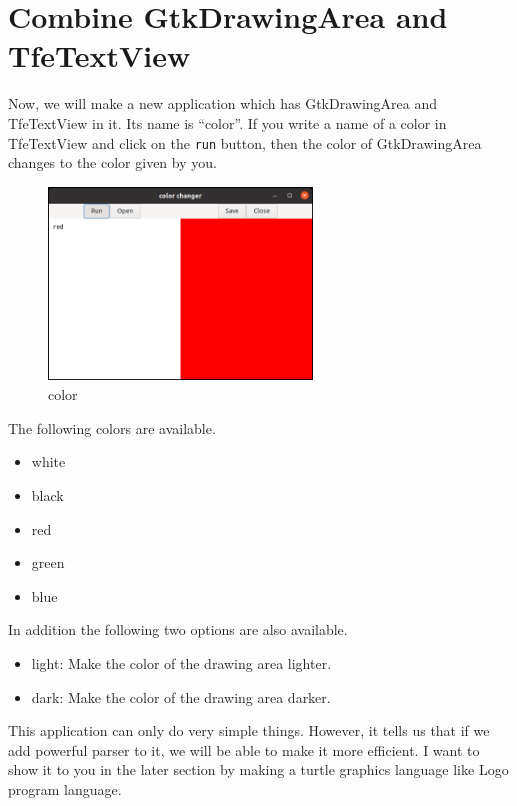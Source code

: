 \hypertarget{combine-gtkdrawingarea-and-tfetextview}{%
\section{Combine GtkDrawingArea and
TfeTextView}\label{combine-gtkdrawingarea-and-tfetextview}}

Now, we will make a new application which has GtkDrawingArea and
TfeTextView in it. Its name is ``color''. If you write a name of a color
in TfeTextView and click on the \passthrough{\lstinline!run!} button,
then the color of GtkDrawingArea changes to the color given by you.

\begin{figure}
\centering
\includegraphics[width=7cm,height=5.13cm]{../image/color.png}
\caption{color}
\end{figure}

The following colors are available.

\begin{itemize}
\tightlist
\item
  white
\item
  black
\item
  red
\item
  green
\item
  blue
\end{itemize}

In addition the following two options are also available.

\begin{itemize}
\tightlist
\item
  light: Make the color of the drawing area lighter.
\item
  dark: Make the color of the drawing area darker.
\end{itemize}

This application can only do very simple things. However, it tells us
that if we add powerful parser to it, we will be able to make it more
efficient. I want to show it to you in the later section by making a
turtle graphics language like Logo program language.

